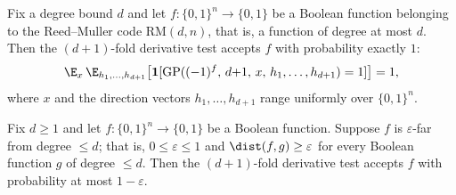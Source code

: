 \begin{lemma}
\label{LowDegreeTest.RM_test_completeness}
\leanok
{}
Fix a degree bound $d$ and let $f : \{0,1\}^n \to \{0,1\}$ be a Boolean function
belonging to the Reed–Muller code $\mathrm{RM}(d,n)$, that is, a function of degree at
most $d$. Then the $(d+1)$-fold derivative test accepts $f$ with probability exactly
$1$:
\[
\E_{x}\,\E_{h_1,\ldots,h_{d+1}}\bigl[\mathbf{1}[\mathrm{GP}((-1)^f,\, d{+}1,\, x,\,
h_1,\ldots,h_{d+1}) = 1]\bigr] = 1,
\]
where $x$ and the direction vectors $h_1,\ldots,h_{d+1}$ range uniformly over
$\{0,1\}^n$.
\end{lemma}

\begin{lemma}
\label{LowDegreeTest.RM_test_soundness}
\leanok
{}
Fix $d \ge 1$ and let $f : \{0,1\}^n \to \{0,1\}$ be a Boolean function. Suppose $f$ is
$\varepsilon$-far from degree $\le d$; that is, $0 \le \varepsilon \le 1$ and
$\dist(f,g) \ge \varepsilon$ for every Boolean function $g$ of degree $\le d$. Then the
$(d{+}1)$-fold derivative test accepts $f$ with probability at most $1 - \varepsilon$.
\end{lemma}
